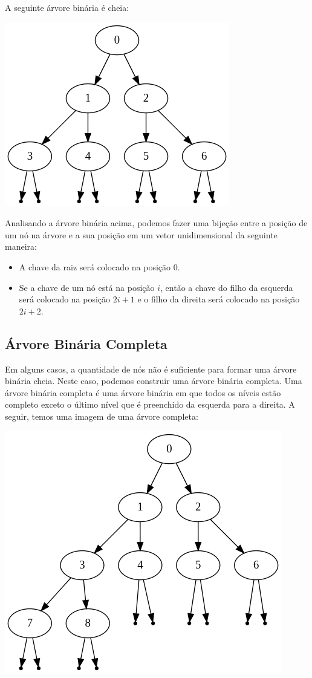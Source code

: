 A seguinte árvore binária é cheia:


\includegraphics[scale=0.3]{images/cheia.png}

Analisando a árvore binária acima, podemos fazer uma bijeção entre a posição de um nó na árvore e a sua posição em um vetor unidimensional da seguinte maneira:

\begin{itemize}
    \item A chave da raiz será colocado na posição 0.
    \item Se a chave de um nó está na posição $i$, então a chave do filho da esquerda será colocado na posição $2i+1$ e o filho da direita será colocado na posição $2i+2$.
\end{itemize}

\subsection{Árvore Binária Completa}

Em alguns casos, a quantidade de nós não é suficiente para formar uma árvore binária cheia. Neste caso, podemos construir uma árvore binária completa. Uma árvore binária completa é uma árvore binária em que todos os níveis estão completo exceto o último nível que é preenchido da esquerda para a direita. A seguir, temos uma imagem de uma árvore completa:


\includegraphics[scale=0.3]{images/completa.png}

